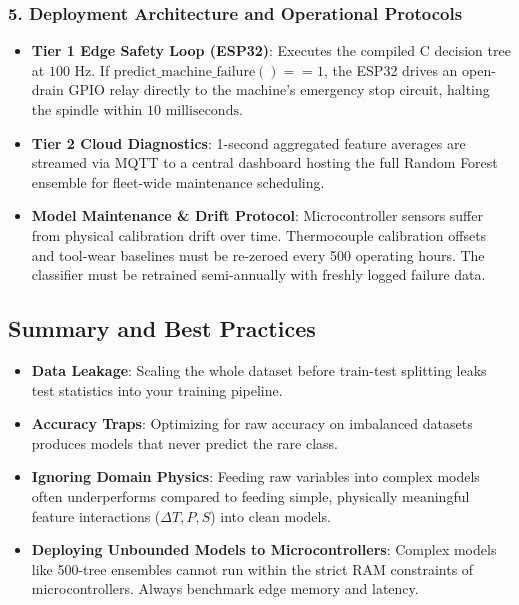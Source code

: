 \subsubsection*{5. Deployment Architecture and Operational Protocols}
\begin{itemize}
    \item \textbf{Tier 1 Edge Safety Loop (ESP32)}: Executes the compiled C decision tree at $100\text{ Hz}$. If $\text{predict\_machine\_failure}() == 1$, the ESP32 drives an open-drain GPIO relay directly to the machine's emergency stop circuit, halting the spindle within $10\text{ milliseconds}$.
    \item \textbf{Tier 2 Cloud Diagnostics}: 1-second aggregated feature averages are streamed via MQTT to a central dashboard hosting the full Random Forest ensemble for fleet-wide maintenance scheduling.
    \item \textbf{Model Maintenance \& Drift Protocol}: Microcontroller sensors suffer from physical calibration drift over time. Thermocouple calibration offsets and tool-wear baselines must be re-zeroed every 500 operating hours. The classifier must be retrained semi-annually with freshly logged failure data.
\end{itemize}

\subsection{Summary and Best Practices}

\begin{warning}
\begin{itemize}
    \item \textbf{Data Leakage}: Scaling the whole dataset before train-test splitting leaks test statistics into your training pipeline.
    \item \textbf{Accuracy Traps}: Optimizing for raw accuracy on imbalanced datasets produces models that never predict the rare class.
    \item \textbf{Ignoring Domain Physics}: Feeding raw variables into complex models often underperforms compared to feeding simple, physically meaningful feature interactions ($\Delta T, P, S$) into clean models.
    \item \textbf{Deploying Unbounded Models to Microcontrollers}: Complex models like 500-tree ensembles cannot run within the strict RAM constraints of microcontrollers. Always benchmark edge memory and latency.
\end{itemize}
\end{warning}

